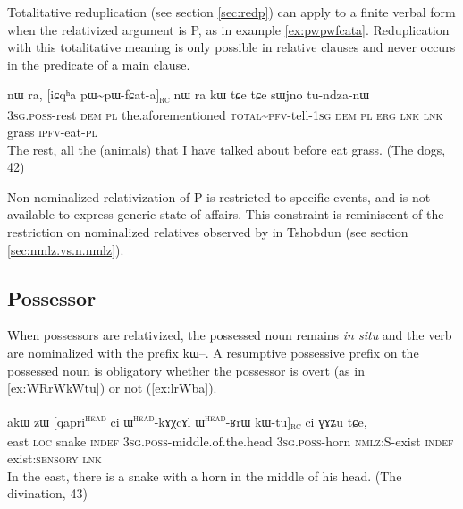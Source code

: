 \documentclass[oldfontcommands,oneside,a4paper,11pt]{article}
\newcommand{\ipa}[1]{{\phon #1}} %
\newcommand{\topic}{\textsc{dem}}
\newcommand{\tete}{\textsuperscript{\textsc{head}}}
\newcommand{\rc}{\textsubscript{\textsc{rc}}}
\begin{document}
Totalitative reduplication  (see section \ref{sec:redp}) can apply to a finite verbal form when the relativized argument is P, as in example \ref{ex:pwpwfcata}. Reduplication with this totalitative meaning is only possible in relative clauses and never occurs in the predicate of a main clause.

     \begin{exe}
   \ex \label{ex:pwpwfcata}
 \gll \ipa{ɯ-ro}   	\ipa{nɯ} \ipa{ra,}   	[\ipa{iɕqʰa}   	\ipa{pɯ\textasciitilde{}pɯ-fɕat-a}]\rc{}   	\ipa{nɯ} \ipa{ra}  	\ipa{kɯ}   	\ipa{tɕe}   	\ipa{tɕe}   	\ipa{sɯjno}   	\ipa{tu-ndza-nɯ}    \\
 \textsc{3sg.poss}-rest \topic{} \textsc{pl} the.aforementioned \textsc{total\textasciitilde{}pfv}-tell-\textsc{1sg} \topic{} \textsc{pl} \textsc{erg} \textsc{lnk} \textsc{lnk} grass \textsc{ipfv}-eat-\textsc{pl} \\
\glt The rest, all the (animals) that I have talked about before eat grass. (The dogs, 42)
\end{exe}

Non-nominalized relativization of P is restricted to specific events, and is not available to express generic state of affairs. This constraint is reminiscent of the restriction on nominalized relatives observed by \citet[10]{jacksonlin07} in Tshobdun (see section \ref{sec:nmlz.vs.n.nmlz}).

  








\subsection{Possessor} \label{sec:possessor}

When possessors are relativized, the possessed noun remains \textit{in situ} and the verb are nominalized with the prefix \ipa{kɯ}--. A resumptive possessive prefix on the possessed noun is obligatory whether the possessor is overt (as in \ref{ex:WRrWkWtu}) or not (\ref{ex:lrWba}).


      \begin{exe}
   \ex \label{ex:WRrWkWtu}
 \gll 
\ipa{akɯ}   	\ipa{zɯ}   	[\ipa{qapri}\tete{}   	\ipa{ci}   	\ipa{ɯ}\tete{}-\ipa{kɤχcɤl}  	\ipa{ɯ}\tete{}-\ipa{ʁrɯ}   	\ipa{kɯ-tu}]\rc{}   	\ipa{ci}   	\ipa{ɣɤʑu}   	\ipa{tɕe,}   \\
east \textsc{loc} snake \textsc{indef} \textsc{3sg.poss}-middle.of.the.head  \textsc{3sg.poss}-horn \textsc{nmlz:S}-exist \textsc{indef} exist:\textsc{sensory}  \textsc{lnk} \\
\glt In the east, there is a snake with a horn in the middle of his head.  (The divination, 43)
\end{exe}
 
\end{document}

